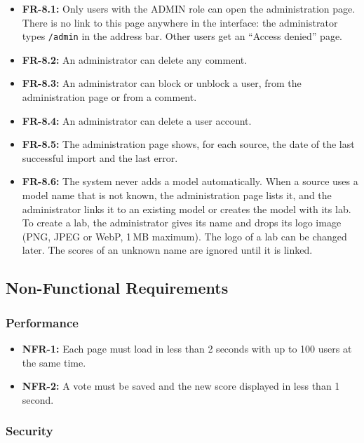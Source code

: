 \documentclass[11pt,a4paper]{article}
\begin{document}
\begin{itemize}
  \item \textbf{FR-8.1:} Only users with the ADMIN role can open the administration page. There is no link to this page anywhere in the interface: the administrator types \texttt{/admin} in the address bar. Other users get an ``Access denied'' page.
  \item \textbf{FR-8.2:} An administrator can delete any comment.
  \item \textbf{FR-8.3:} An administrator can block or unblock a user, from the administration page or from a comment.
  \item \textbf{FR-8.4:} An administrator can delete a user account.
  \item \textbf{FR-8.5:} The administration page shows, for each source, the date of the last successful import and the last error.
  \item \textbf{FR-8.6:} The system never adds a model automatically. When a source uses a model name that is not known, the administration page lists it, and the administrator links it to an existing model or creates the model with its lab. To create a lab, the administrator gives its name and drops its logo image (PNG, JPEG or WebP, 1\,MB maximum). The logo of a lab can be changed later. The scores of an unknown name are ignored until it is linked.
\end{itemize}

\subsection{Non-Functional Requirements}

\subsubsection{Performance}

\begin{itemize}
  \item \textbf{NFR-1:} Each page must load in less than 2 seconds with up to 100 users at the same time.
  \item \textbf{NFR-2:} A vote must be saved and the new score displayed in less than 1 second.
\end{itemize}

\subsubsection{Security}
\end{document}
